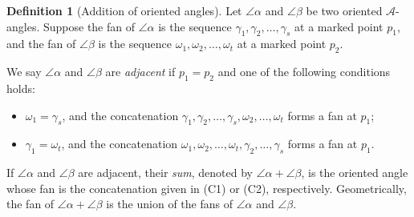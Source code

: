 \documentclass[a4paper,10pt]{amsart}
\theoremstyle{plain}          %
\theoremstyle{definition}
\newtheorem{definition}[theorem]{Definition}
\begin{document}
\begin{definition}[Addition of oriented angles]
Let $\angle\alpha$ and $\angle\beta$ be two oriented $\mathcal{A}$-angles. 
Suppose the fan of $\angle\alpha$ is the sequence $\gamma_1, \gamma_2, \dots, \gamma_s$ at a marked point $p_1$, 
and the fan of $\angle\beta$ is the sequence $\omega_1, \omega_2, \dots, \omega_t$ at a marked point $p_2$. 

We say $\angle\alpha$ and $\angle\beta$ are \emph{adjacent} if $p_1 = p_2$ and one of the following conditions holds:
\begin{itemize}
    \item[(C1)] $\omega_1 = \gamma_s$, and the concatenation $\gamma_1, \gamma_2, \dots, \gamma_s, \omega_2, \dots, \omega_t$ forms a fan at $p_1$;
    \item[(C2)] $\gamma_1 = \omega_t$, and the concatenation $\omega_1, \omega_2, \dots, \omega_t, \gamma_2, \dots, \gamma_s$ forms a fan at $p_1$.
\end{itemize}

If $\angle\alpha$ and $\angle\beta$ are adjacent, their \emph{sum}, denoted by $\angle\alpha + \angle\beta$, 
is the oriented angle whose fan is the concatenation given in (C1) or (C2), respectively.
Geometrically, the fan of $\angle\alpha + \angle\beta$ is the union of the fans of $\angle\alpha$ and $\angle\beta$.
\end{definition}
\end{document}

